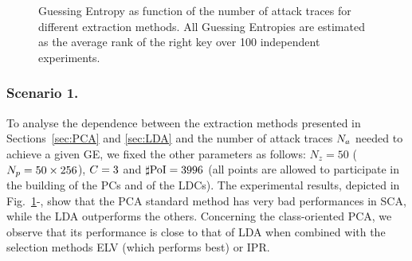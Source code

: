 \begin{figure}[t]
\caption[Guessing Entropy as function of the number of attack traces]{Guessing Entropy as function of the number of attack traces for different extraction methods. All Guessing Entropies are estimated as the average rank of the right key over 100 independent experiments.}\label{fig:scenario1}
\end{figure}
\subsubsection{Scenario 1.}
To analyse the dependence between the extraction methods presented in Sections~\ref{sec:PCA} and \ref{sec:LDA} and the number of attack traces $N_a$ needed to achieve a given GE, we fixed the other parameters as follows: $N_z=50$ ($N_p=50\times 256$), $C = 3$ and $\sharp\mathrm{PoI} = 3996$ (all points are allowed to participate in the building of the PCs and of the LDCs). The experimental results, depicted in Fig.~\ref{fig:scenario1}-, show that the PCA standard method has very bad performances in SCA, while the LDA outperforms the others. Concerning the class-oriented PCA, we observe that its performance is close to that of LDA when combined with the selection methods ELV (which performs best) or IPR.  



